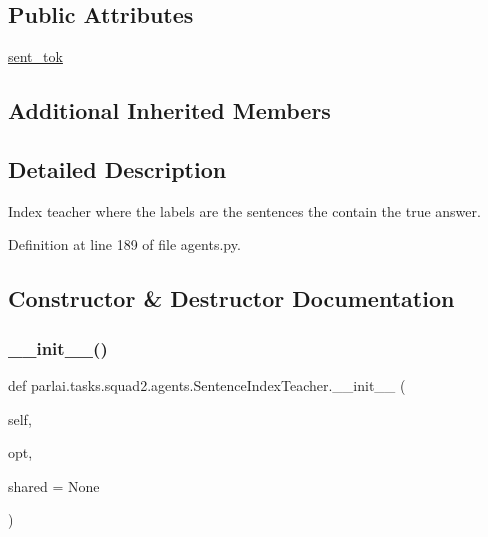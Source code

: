 \subsection*{Public Attributes}
\begin{DoxyCompactItemize}
\item 
\hyperlink{classparlai_1_1tasks_1_1squad2_1_1agents_1_1SentenceIndexTeacher_ac9b01a4a40b5a1a6de68d24e075a22fb}{sent\+\_\+tok}
\end{DoxyCompactItemize}
\subsection*{Additional Inherited Members}


\subsection{Detailed Description}
\begin{DoxyVerb}Index teacher where the labels are the sentences the contain the true
answer.
\end{DoxyVerb}
 

Definition at line 189 of file agents.\+py.



\subsection{Constructor \& Destructor Documentation}
\mbox{\label{classparlai_1_1tasks_1_1squad2_1_1agents_1_1SentenceIndexTeacher_ab4c46deb33f625365691be6b36f15a03}} 
\subsubsection{\texorpdfstring{\+\_\+\+\_\+init\+\_\+\+\_\+()}{\_\_init\_\_()}}
{\footnotesize\ttfamily def parlai.\+tasks.\+squad2.\+agents.\+Sentence\+Index\+Teacher.\+\_\+\+\_\+init\+\_\+\+\_\+ (\begin{DoxyParamCaption}\item[{}]{self,  }\item[{}]{opt,  }\item[{}]{shared = {\ttfamily None} }\end{DoxyParamCaption})}



